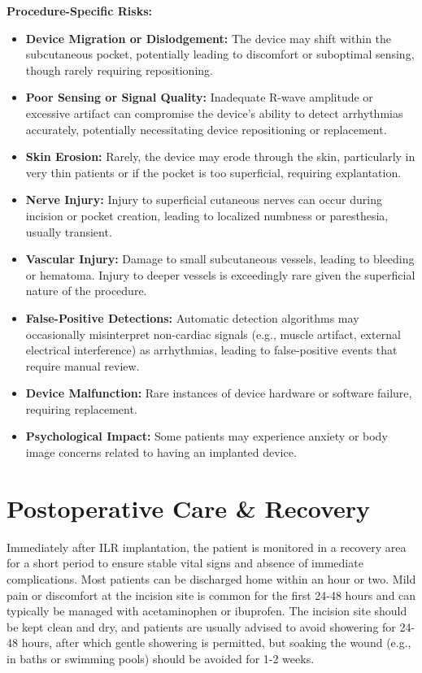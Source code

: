 \textbf{Procedure-Specific Risks:}
\begin{itemize}
  \item \textbf{Device Migration or Dislodgement:} The device may shift within the subcutaneous pocket, potentially leading to discomfort or suboptimal sensing, though rarely requiring repositioning.
  \item \textbf{Poor Sensing or Signal Quality:} Inadequate R-wave amplitude or excessive artifact can compromise the device's ability to detect arrhythmias accurately, potentially necessitating device repositioning or replacement.
  \item \textbf{Skin Erosion:} Rarely, the device may erode through the skin, particularly in very thin patients or if the pocket is too superficial, requiring explantation.
  \item \textbf{Nerve Injury:} Injury to superficial cutaneous nerves can occur during incision or pocket creation, leading to localized numbness or paresthesia, usually transient.
  \item \textbf{Vascular Injury:} Damage to small subcutaneous vessels, leading to bleeding or hematoma. Injury to deeper vessels is exceedingly rare given the superficial nature of the procedure.
  \item \textbf{False-Positive Detections:} Automatic detection algorithms may occasionally misinterpret non-cardiac signals (e.g., muscle artifact, external electrical interference) as arrhythmias, leading to false-positive events that require manual review.
  \item \textbf{Device Malfunction:} Rare instances of device hardware or software failure, requiring replacement.
\item \textbf{Psychological Impact:} Some patients may experience anxiety or body image concerns related to having an implanted device.
\end{itemize}

\section*{Postoperative Care \& Recovery}
Immediately after ILR implantation, the patient is monitored in a recovery area for a short period to ensure stable vital signs and absence of immediate complications. Most patients can be discharged home within an hour or two. Mild pain or discomfort at the incision site is common for the first 24-48 hours and can typically be managed with acetaminophen or ibuprofen. The incision site should be kept clean and dry, and patients are usually advised to avoid showering for 24-48 hours, after which gentle showering is permitted, but soaking the wound (e.g., in baths or swimming pools) should be avoided for 1-2 weeks.

